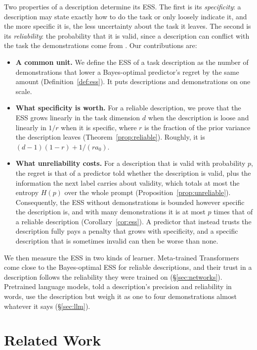 \documentclass[10pt,twocolumn]{article}
\begin{document}
Two properties of a description determine its ESS. The first is its \emph{specificity}: a description may state exactly how to do the task or only loosely indicate it, and the more specific it is, the less uncertainty about the task it leaves. The second is its \emph{reliability}: the probability that it is valid, since a description can conflict with the task the demonstrations come from \citep{evans2006}. Our contributions are:
\begin{itemize}
    \item \textbf{A common unit.} We define the ESS of a task description as the number of demonstrations that lower a Bayes-optimal predictor's regret by the same amount (Definition~\ref{def:ess}). It puts descriptions and demonstrations on one scale.
    \item \textbf{What specificity is worth.} For a reliable description, we prove that the ESS grows linearly in the task dimension $d$ when the description is loose and linearly in $1/r$ when it is specific, where $r$ is the fraction of the prior variance the description leaves (Theorem~\ref{prop:reliable}). Roughly, it is $(d-1)(1-r) + 1/(r a_0)$.
    \item \textbf{What unreliability costs.} For a description that is valid with probability $p$, the regret is that of a predictor told whether the description is valid, plus the information the next label carries about validity, which totals at most the entropy $H(p)$ over the whole prompt (Proposition~\ref{prop:unreliable}). Consequently, the ESS without demonstrations is bounded however specific the description is, and with many demonstrations it is at most $p$ times that of a reliable description (Corollary~\ref{cor:ess}). A predictor that instead trusts the description fully pays a penalty that grows with specificity, and a specific description that is sometimes invalid can then be worse than none.
\end{itemize}
We then measure the ESS in two kinds of learner. Meta-trained Transformers come close to the Bayes-optimal ESS for reliable descriptions, and their trust in a description follows the reliability they were trained on (\S\ref{sec:networks}). Pretrained language models, told a description's precision and reliability in words, use the description but weigh it as one to four demonstrations almost whatever it says (\S\ref{sec:llm}).

\section{Related Work}
\end{document}
